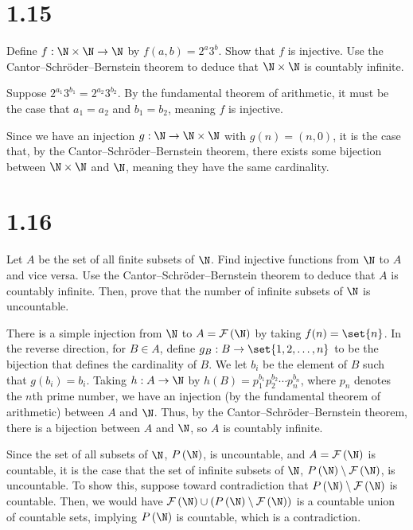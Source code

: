 \documentclass[10pt]{mypackage}
\begin{document}
\RaggedRight
\section{1.15}%
\begin{problem}
  Define $f: \N\times\N\rightarrow\N$ by $f(a,b) = 2^a3^b$. Show that $f$ is injective. Use the Cantor--Schröder--Bernstein theorem to deduce that $\N\times\N$ is countably infinite.
\end{problem}
\begin{solution}
  Suppose $2^{a_1}3^{b_1} = 2^{a_2}3^{b_2}$. By the fundamental theorem of arithmetic, it must be the case that $a_1 = a_2$ and $b_1 = b_2$, meaning $f$ is injective.\newline

  Since we have an injection $g: \N\rightarrow \N\times\N$ with $g(n) = (n,0)$, it is the case that, by the Cantor--Schröder--Bernstein theorem, there exists some bijection between $\N\times\N$ and $\N$, meaning they have the same cardinality.
\end{solution}
\section{1.16}%
\begin{problem}
  Let $A$ be the set of all finite subsets of $\N$. Find injective functions from $\N$ to $A$ and vice versa. Use the Cantor--Schröder--Bernstein theorem to deduce that $A$ is countably infinite. Then, prove that the number of infinite subsets of $\N$ is uncountable.
\end{problem}
\begin{solution}
  There is a simple injection from $\N$ to $A = \mathcal{F}\left(\N\right)$ by taking $f(n) = \set{n}$. In the reverse direction, for $B\in A$, define $g_B: B\rightarrow \set{1,2,\dots,n}$ to be the bijection that defines the cardinality of $B$. We let $b_i$ be the element of $B$ such that $g\left(b_i\right) = b_i$. Taking $h: A\rightarrow \N$ by $h(B) = p_1^{b_1}p_2^{b_2}\cdots p_n^{b_n}$, where $p_n$ denotes the $n$th prime number, we have an injection (by the fundamental theorem of arithmetic) between $A$ and $\N$. Thus, by the Cantor--Schröder--Bernstein theorem, there is a bijection between $A$ and $\N$, so $A$ is countably infinite.\newline

  Since the set of all subsets of $\N$, $P\left(\N\right)$, is uncountable, and $A = \mathcal{F}\left(\N\right)$ is countable, it is the case that the set of infinite subsets of $\N$, $P\left(\N\right) \setminus \mathcal{F}\left(\N\right)$, is uncountable. To show this, suppose toward contradiction that $P\left(\N\right)\setminus \mathcal{F}\left(\N\right)$ is countable. Then, we would have $\mathcal{F}\left(\N\right)\cup \left(P\left(\N\right)\setminus \mathcal{F}\left(\N\right)\right)$ is a countable union of countable sets, implying $P\left(\N\right)$ is countable, which is a contradiction.
\end{solution}
\end{document}
